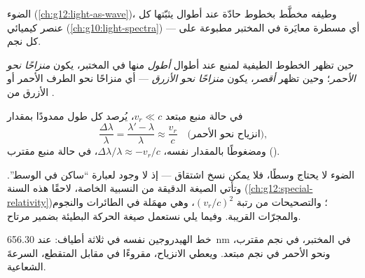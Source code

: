الضوء  (\cref{ch:g12:light-as-wave})، وطيفه مخطَّط بخطوط حادّة عند
أطوال  يثبّتها كل عنصر كيميائي (\cref{ch:g10:light-spectra}) --- أي مسطرة
معايَرة في المختبر مطبوعة على كل نجم.

\begin{definition}\label{def:g12:doppler-effect:redshift}
حين تظهر الخطوط الطيفية لمنبع عند أطوال  \emph{أطول} منها في
المختبر، يكون  \emph{منزاحًا نحو الأحمر}؛ وحين تظهر \emph{أقصر}،
يكون \emph{منزاحًا نحو الأزرق} --- أي منزاحًا نحو الطرف الأحمر أو الأزرق من
.
\end{definition}

\begin{proposition}\label{prop:g12:doppler-effect:light}
في حالة منبع مبتعد  $v_r \ll c$، يُرصد كل طول 
ممدودًا بمقدار
\[ \frac{\Delta \lambda}{\lambda} = \frac{\lambda' - \lambda}{\lambda} \approx \frac{v_r}{c} \quad \text{(انزياح نحو الأحمر)}, \]
ومضغوطًا بالمقدار نفسه، $\Delta\lambda/\lambda \approx -v_r/c$، في حالة منبع
مقترب ().
\end{proposition}
\admitted

\begin{remark}\label{rem:g12:doppler-effect:honest}
الضوء لا يحتاج وسطًا، فلا يمكن نسخ اشتقاق  --- إذ لا وجود لعبارة ``ساكن
في الوسط''. وتأتي الصيغة الدقيقة من النسبية الخاصة، لاحقًا هذه السنة
(\cref{ch:g12:special-relativity})؛ والتصحيحات من رتبة $(v_r/c)^2$، وهي مهمَلة في
الطائرات والنجوم والمجرّات القريبة. وفيما يلي نستعمل صيغة الحركة البطيئة بضمير مرتاح.
\end{remark}

\begin{omfigure}

{\small خط الهيدروجين نفسه في ثلاثة أطياف: عند \qty{656.30}{nm} في المختبر،
 في نجم مقترب، ونحو الأحمر في نجم مبتعد. ويعطي الانزياح، مقروءًا
في مقابل  المتقطع، السرعةَ الشعاعية.}
\end{omfigure}


